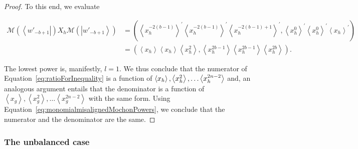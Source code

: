 \documentclass{article}
\begin{document}
\begin{proof}
  To this end, we evaluate
  \begin{small}
    \begin{align*}
      \mathcal{M}(\left\langle w'_{-b+1}\right|)X_{h}\mathcal{M}(\left|w'_{-b+1}\right\rangle ) & =\left(\left\langle x_{h}^{-2(b-1)}\right\rangle ^{\prime}\left\langle x_{h}^{-2(b-1)}\right\rangle ^{\prime}\left\langle x_{h}^{-2(b-1)+1}\right\rangle ^{\prime},\left\langle x_{h}^{0}\right\rangle ^{\prime}\left\langle x_{h}^{0}\right\rangle ^{\prime}\left\langle x_{h}\right\rangle ^{\prime}\right) \\
                                                                                                & =\left(\left\langle x_{h}\right\rangle \left\langle x_{h}\right\rangle \left\langle x_{h}^{2}\right\rangle ,\left\langle x_{h}^{2b-1}\right\rangle \left\langle x_{h}^{2b-1}\right\rangle \left\langle x_{h}^{2b}\right\rangle \right).
    \end{align*}
  \end{small}
  The lowest power is, manifestly, $l=1$. We thus conclude that the
  numerator of Equation~\eqref{eq:ratioForInequality} is a function of $\left\langle x_{h}\right\rangle ,\left\langle x_{h}^{2}\right\rangle ,\dots\text{\ensuremath{\left\langle x_{h}^{2n-2}\right\rangle }}$ and,
  an analogous argument entails that the denominator is a function of
  $\left\langle x_{g}\right\rangle ,\left\langle x_{g}^{2}\right\rangle ,\dots\left\langle x_{g}^{2n-2}\right\rangle $
  with the same form. Using Equation~\eqref{eq:monomialmisalignedMochonPowers},
  we conclude that the numerator and the denominator are the same.
\end{proof}



\subsubsection{The unbalanced case}
\label{subsubsec:unbalancedmonomialalgebraic}
\end{document}
